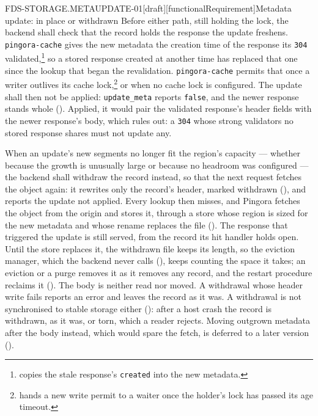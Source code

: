 \begin{requirement}{FDS-STORAGE.METAUPDATE-01}[draft][functionalRequirement]{Metadata update: in place or withdrawn}
  Before either path, still holding the lock, the backend shall check that
  the record holds the response the update freshens. \texttt{pingora-cache}
  gives the new metadata the creation time of the response its \texttt{304}
  validated,\footnote{
  copies the stale response's \texttt{created} into the new metadata.} so a
  stored response created at another time has replaced that one since the
  lookup that began the revalidation. \texttt{pingora-cache} permits that
  once a writer outlives its cache lock,\footnote{
  hands a new write permit to a waiter once the holder's lock has passed its
  age timeout.} or when no cache lock is configured. The update shall then not
  be applied: \texttt{update\_meta} reports \texttt{false}, and the newer
  response stands whole (). Applied, it
  would pair the validated response's header fields with the newer response's
  body, which  rules out: a \texttt{304} whose strong
  validators no stored response shares must not update any.

  When an update's new segments no longer fit the region's capacity ---
  whether because the growth is unusually large or because no headroom was
  configured --- the backend shall withdraw the record instead, so that the
  next request fetches the object again: it rewrites only the record's
  header, marked withdrawn (), and reports
  the update not applied. Every lookup then misses, and Pingora fetches the
  object from the origin and stores it, through a store whose region is
  sized for the new metadata and whose rename replaces the file
  (). The response that triggered the update
  is still served, from the record its hit handler holds open. Until the
  store replaces it, the withdrawn file keeps its length, so the eviction
  manager, which the backend never calls (),
  keeps counting the space it takes; an eviction or a purge removes it as it
  removes any record, and the restart procedure reclaims it
  (). The body is neither read nor moved. A
  withdrawal whose header write fails reports an error and leaves the
  record as it was. A withdrawal is not synchronised to stable storage
  either (): after a host crash the
  record is withdrawn, as it was, or torn, which a reader rejects. Moving
  outgrown metadata after the body instead, which would spare the fetch, is
  deferred to a later version ().


\end{requirement}

